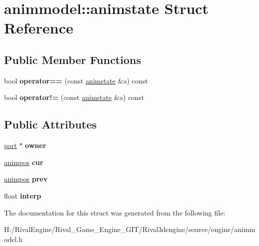 \hypertarget{structanimmodel_1_1animstate}{}\section{animmodel\+:\+:animstate Struct Reference}
\label{structanimmodel_1_1animstate}
\subsection*{Public Member Functions}
\begin{DoxyCompactItemize}
\item 
\mbox{\label{structanimmodel_1_1animstate_a4c070cf8d156f6b0d4ed807b5de5d0d2}} 
bool {\bfseries operator==} (const \hyperlink{structanimmodel_1_1animstate}{animstate} \&a) const
\item 
\mbox{\label{structanimmodel_1_1animstate_a847fb5c99a1b373a7ddb1e771d709dfc}} 
bool {\bfseries operator!=} (const \hyperlink{structanimmodel_1_1animstate}{animstate} \&a) const
\end{DoxyCompactItemize}
\subsection*{Public Attributes}
\begin{DoxyCompactItemize}
\item 
\mbox{\label{structanimmodel_1_1animstate_ac017351f751938ec79cb173c7e95baf3}} 
\hyperlink{structanimmodel_1_1part}{part} $\ast$ {\bfseries owner}
\item 
\mbox{\label{structanimmodel_1_1animstate_a0ab50671019e0beef50cdc6ceb5a137d}} 
\hyperlink{structanimmodel_1_1animpos}{animpos} {\bfseries cur}
\item 
\mbox{\label{structanimmodel_1_1animstate_ab4354f5ac989d48972d087a2b92d652a}} 
\hyperlink{structanimmodel_1_1animpos}{animpos} {\bfseries prev}
\item 
\mbox{\label{structanimmodel_1_1animstate_a515959fdd3c2579e6e172e26bab53700}} 
float {\bfseries interp}
\end{DoxyCompactItemize}


The documentation for this struct was generated from the following file\+:\begin{DoxyCompactItemize}
\item 
H\+:/\+Rival\+Engine/\+Rival\+\_\+\+Game\+\_\+\+Engine\+\_\+\+G\+I\+T/\+Rival3dengine/source/engine/animmodel.\+h\end{DoxyCompactItemize}
